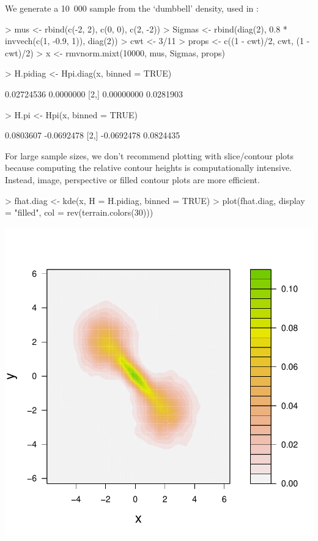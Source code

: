 \documentclass[a4paper,11pt]{article}
\begin{document}
We generate a 10~000 sample from the `dumbbell' density, used in 
\citet*{duong2005}:
\begin{Schunk}
\begin{Sinput}
> mus <- rbind(c(-2, 2), c(0, 0), c(2, -2))
> Sigmas <- rbind(diag(2), 0.8 * invvech(c(1, -0.9, 1)), diag(2))
> cwt <- 3/11
> props <- c((1 - cwt)/2, cwt, (1 - cwt)/2)
> x <- rmvnorm.mixt(10000, mus, Sigmas, props)
\end{Sinput}
\end{Schunk}
\begin{Schunk}
\begin{Sinput}
> H.pidiag <- Hpi.diag(x, binned = TRUE)
\end{Sinput}
\begin{Soutput}
           [,1]      [,2]
[1,] 0.02724536 0.0000000
[2,] 0.00000000 0.0281903
\end{Soutput}
\begin{Sinput}
> H.pi <- Hpi(x, binned = TRUE)
\end{Sinput}
\begin{Soutput}
           [,1]       [,2]
[1,]  0.0803607 -0.0692478
[2,] -0.0692478  0.0824435
\end{Soutput}
\end{Schunk}
For large sample sizes, we don't recommend plotting with slice/contour plots
because computing the relative contour heights is computationally intensive.
Instead, image, perspective or filled contour plots are more efficient.
\begin{Schunk}
\begin{Sinput}
> fhat.diag <- kde(x, H = H.pidiag, binned = TRUE)
> plot(fhat.diag, display = "filled", col = rev(terrain.colors(30)))
\end{Sinput}
\end{Schunk}
\begin{center}  
\includegraphics{kde-026}
\end{center}
\end{document}
